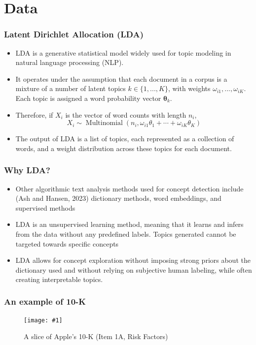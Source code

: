 \documentclass{beamer}
\newcommand{\insertfigurenoffo}[3]{
\begin{figure}[h!]
  \centering
  \texttt{[image: \#1]}
  \caption{#2}
  \label{fig:#1}
\end{figure}
}
\begin{document}
\section{Data}


\begin{frame}
\frametitle{Latent Dirichlet Allocation (LDA)}
\begin{itemize}
\small
\item LDA is a generative statistical model widely used for topic modeling in natural language processing (NLP).
\item It operates under the assumption that each document in a corpus is a mixture of a number of latent topics $k \in \{1, ..., K\}$, with weights $\omega_{i1}, ..., \omega_{iK}$. Each topic is assigned a word probability vector $\mathbf{\theta}_k$. 
\item Therefore, if $X_i$ is the vector of word counts with length $n_i$, 
\begin{equation}
X_i \sim \operatorname{Multinomial}\left(n_i, \omega_{i 1} \theta_1+\cdots+\omega_{i K} \theta_K\right)
\end{equation}
\item The output of LDA is a list of topics, each represented as a collection of words, and a weight distribution across these topics for each document.
\end{itemize}
\end{frame}

\begin{frame}
\frametitle{Why LDA?}
\begin{itemize}
\item Other algorithmic text analysis methods used for concept detection include (Ash and Hansen, 2023) dictionary methods, word embeddings, and supervised methods
\item LDA is an unsupervised learning method, meaning that it learns and infers from the data without any predefined labels. Topics generated cannot be targeted towards specific concepts
\item LDA allows for concept exploration without imposing strong priors about the dictionary used and without relying on subjective human labeling, while often creating interpretable topics.
\end{itemize}
\end{frame}

\begin{frame}
  \frametitle{An example of 10-K}
\insertfigurenoffo{apples_1a}{A slice of Apple's 10-K (Item 1A, Risk Factors)}{0.8}
\end{frame}
\end{document}
